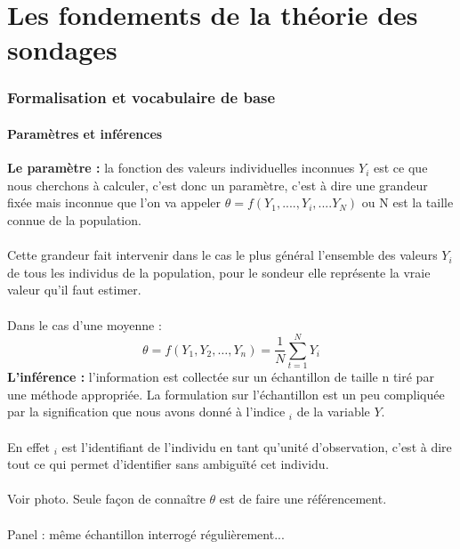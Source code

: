 \documentclass{article}
\begin{document}
\part*{Les fondements de la théorie des sondages}
\section{Formalisation et vocabulaire de base}
\subsection{Paramètres et inférences}
\textbf{Le paramètre :} la fonction des valeurs individuelles inconnues $Y_i$ est ce que nous cherchons à calculer, c'est donc un paramètre, c'est à dire une grandeur fixée mais inconnue que l'on va appeler $\theta = f(Y_1, ...., Y_i, .... Y_N)$ ou N est la taille connue de la population. \\ \\
Cette grandeur fait intervenir dans le cas le plus général l'ensemble des valeurs $Y_i$ de tous les individus de la population, pour le sondeur elle représente  la vraie valeur qu'il faut estimer. \\ \\
Dans le cas d'une moyenne : 
\begin{equation*}
    \theta = f(Y_1, Y_2,\dots, Y_n) = \dfrac{1}{N}\sum_{t=1}^{N}Y_i    
\end{equation*}
\textbf{L'inférence :} l'information est collectée sur un échantillon de taille n tiré par une méthode appropriée. La formulation sur l'échantillon est un peu compliquée par la signification que nous avons donné à l'indice $_i$ de la variable $Y$. \\ \\
En effet $_i$ est l'identifiant de l'individu en tant qu'unité d'observation, c'est à dire tout ce qui permet d'identifier sans ambiguïté cet individu. \\ \\
Voir photo. Seule façon de connaître $\theta$ est de faire une référencement. \\ \\
Panel : même échantillon interrogé régulièrement...
\end{document}

